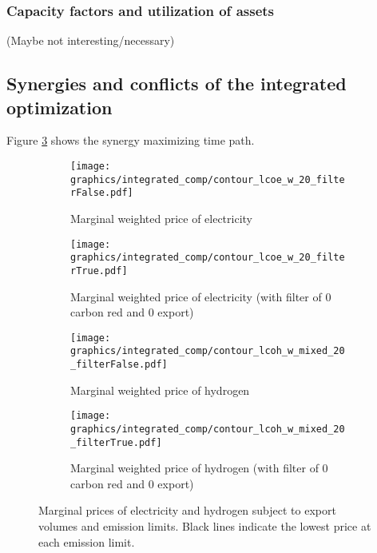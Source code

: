 \subsubsection{Capacity factors and utilization of assets}
(Maybe not interesting/necessary)



\subsection{Synergies and conflicts of the integrated optimization}
\label{subsec: syn_conf_integrated}
Figure \ref{fig:contour_plot} shows the synergy maximizing time path.


\begin{figure*}[t] %
    \centering
    \begin{subfigure}[b]{0.45\linewidth}
        \centering
        \texttt{[image: graphics/integrated\_comp/contour\_lcoe\_w\_20\_filterFalse.pdf]}
        \caption{Marginal weighted price of electricity}
        \label{fig:contour_plot}
    \end{subfigure}
    \hfill
    \begin{subfigure}[b]{0.45\linewidth}
        \centering
        \texttt{[image: graphics/integrated\_comp/contour\_lcoe\_w\_20\_filterTrue.pdf]}
        \caption{Marginal weighted price of electricity (with filter of 0 carbon red and 0 export)}
        \label{fig:contour_plot}
    \end{subfigure}
    \hfill
    \begin{subfigure}[b]{0.45\linewidth}
        \centering
        \texttt{[image: graphics/integrated\_comp/contour\_lcoh\_w\_mixed\_20\_filterFalse.pdf]}
        \caption{Marginal weighted price of hydrogen}
        \label{fig:contour_plot}
    \end{subfigure}
    \hfill
    \begin{subfigure}[b]{0.45\linewidth}
        \centering
        \texttt{[image: graphics/integrated\_comp/contour\_lcoh\_w\_mixed\_20\_filterTrue.pdf]}
        \caption{Marginal weighted price of hydrogen (with filter of 0 carbon red and 0 export)}
        \label{fig:contour_plot_totalsystem}
    \end{subfigure}
    \hfill

    \caption{Marginal prices of electricity and hydrogen subject to export volumes and emission limits. Black lines indicate the lowest price at each emission limit.}
    \label{fig:comparison}
\end{figure*}


